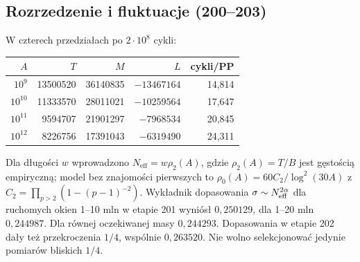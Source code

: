 \documentclass[11pt,a4paper]{article}
\theoremstyle{definition}\newtheorem{defn}[tw]{Definicja}
\theoremstyle{remark}\newtheorem*{uw}{Uwaga}
\begin{document}
\subsection{Rozrzedzenie i fluktuacje (200--203)}
W czterech przedziałach po $2\cdot10^8$ cykli:
\begin{center}
\begin{tabular}{rrrrr}
\toprule $A$&$T$&$M$&$L$&cykli/PP\\\midrule
$10^9$&13500520&36140835&$-13467164$&14,814\\
$10^{10}$&11333570&28011021&$-10259564$&17,647\\
$10^{11}$&9594707&21901297&$-7968534$&20,845\\
$10^{12}$&8226756&17391043&$-6319490$&24,311\\\bottomrule
\end{tabular}
\end{center}
Dla długości $w$ wprowadzono $N_{\mathrm{eff}}=w\rho_2(A)$, gdzie
$\rho_2(A)=T/B$ jest gęstością empiryczną; model bez znajomości pierwszych
to $\rho_0(A)=60C_2/\log^2(30A)$ z $C_2=\prod_{p>2}(1-(p-1)^{-2})$.
Wykładnik dopasowania $\sigma\sim N_{\rm eff}^{2\alpha}$ dla ruchomych
okien 1--10 mln w etapie 201 wyniósł $0{,}250129$, dla 1--20 mln
$0{,}244987$. Dla równej oczekiwanej masy $0{,}244293$.
Dopasowania w etapie 202 dały też przekroczenia $1/4$, wspólnie $0{,}263520$.
Nie wolno selekcjonować jedynie pomiarów bliskich $1/4$.
\end{document}

